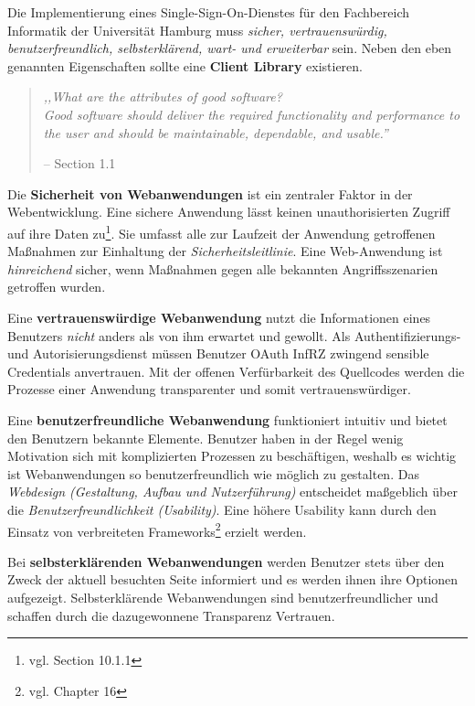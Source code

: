 \documentclass[12pt,a4paper,pointednumbers,abstracton]{scrartcl}
\begin{document}
Die Implementierung eines Single-Sign-On-Dienstes für den Fachbereich Informatik der Universität Hamburg muss \emph{sicher, vertrauenswürdig, benutzerfreundlich, selbsterklärend, wart- und erweiterbar} sein.
Neben den eben genannten Eigenschaften sollte eine \textbf{Client Library} existieren.

\begin{quote}
\emph{,,What are the attributes of good software?\\
Good software should deliver the required functionality and performance to the user and should be maintainable, dependable, and usable.''}
\begin{flushright}
\small{-- \cite{Som2010} Section 1.1}
\end{flushright}
\end{quote}

Die \textbf{Sicherheit von Webanwendungen} ist ein zentraler Faktor in der Webentwicklung.
Eine sichere Anwendung lässt keinen unauthorisierten Zugriff auf ihre Daten zu\footnote{vgl. \cite{Som2010} Section 10.1.1}.
Sie umfasst alle zur Laufzeit der Anwendung getroffenen Maßnahmen zur Einhaltung der \emph{Sicherheitsleitlinie}.
Eine Web-Anwendung ist \emph{hinreichend} sicher, wenn Maßnahmen gegen alle bekannten Angriffsszenarien getroffen wurden.

Eine \textbf{vertrauenswürdige Webanwendung} nutzt die Informationen eines Benutzers \emph{nicht} anders als von ihm erwartet und gewollt.
Als Authentifizierungs- und Autorisierungsdienst müssen Benutzer OAuth InfRZ zwingend sensible Credentials anvertrauen.
Mit der offenen Verfürbarkeit des Quellcodes werden die Prozesse einer Anwendung transparenter und somit vertrauenswürdiger.

Eine \textbf{benutzerfreundliche Webanwendung} funktioniert intuitiv und bietet den Benutzern bekannte Elemente.
Benutzer haben in der Regel wenig Motivation sich mit komplizierten Prozessen zu beschäftigen, weshalb es wichtig ist Webanwendungen so benutzerfreundlich wie möglich zu gestalten.
Das \emph{Webdesign (Gestaltung, Aufbau und Nutzerführung)} entscheidet maßgeblich über die \emph{Benutzerfreundlichkeit (Usability)}.
Eine höhere Usability kann durch den Einsatz von verbreiteten Frameworks\footnote{vgl. \cite{Som2010} Chapter 16} erzielt werden.

Bei \textbf{selbsterklärenden Webanwendungen} werden Benutzer stets über den Zweck der aktuell besuchten Seite informiert und es werden ihnen ihre Optionen aufgezeigt.
Selbsterklärende Webanwendungen sind benutzerfreundlicher und schaffen durch die dazugewonnene Transparenz Vertrauen.
\end{document}
